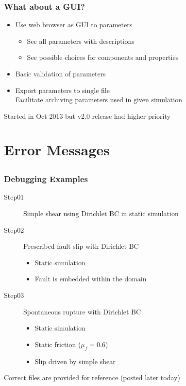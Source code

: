 \documentclass{beamer}
\begin{document}
\begin{frame}
  \frametitle{What about a GUI?}

  \begin{itemize}
  \item Use web browser as GUI to parameters
    \begin{itemize}
    \item See all parameters with descriptions
    \item See possible choices for components and properties
    \end{itemize}
  \item Basic validation of parameters
  \item Export parameters to single file\\
    Facilitate archiving parameters used in given simulation
  \end{itemize}

  \vfill
  Started in Oct 2013 but v2.0 release had higher priority
  
\end{frame}


\section{Error Messages}
\subsection{}

\begin{frame}
  \frametitle{Debugging Examples}

  \begin{description}
  \item[Step01] Simple shear using Dirichlet BC in static simulation
  \item[Step02] Prescribed fault slip with Dirichlet BC
    \begin{itemize}
    \item Static simulation
    \item Fault is embedded within the domain
    \end{itemize}
  \item[Step03] Spontaneous rupture with Dirichlet BC
    \begin{itemize}
    \item Static simulation
    \item Static friction ($\mu_f=0.6$)
    \item Slip driven by simple shear
    \end{itemize}
  \end{description}
  \vfill
  Correct files are provided for reference (posted later today)
  
\end{frame}
\end{document}
